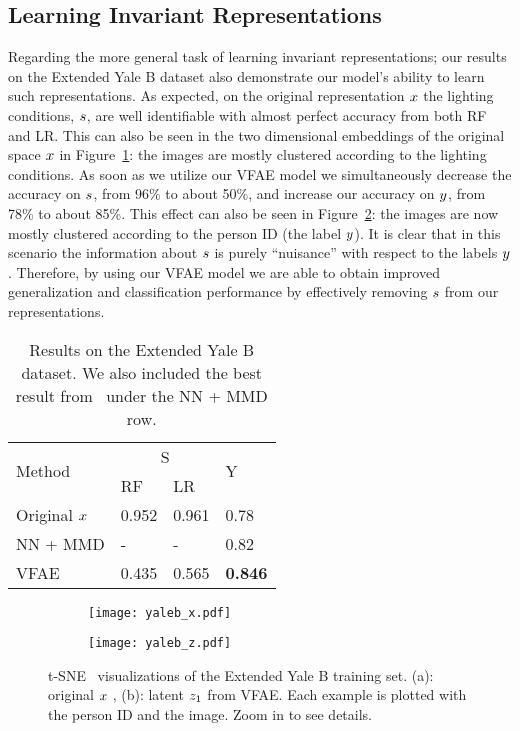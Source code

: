 \subsection{Learning Invariant Representations}
Regarding the more general task of learning invariant representations; our results on the Extended Yale B dataset also demonstrate our model's ability to learn such representations. As expected, on the original representation $\*x$ the lighting conditions, $\*s$, are well identifiable with almost perfect accuracy from both RF and LR. This can also be seen in the two dimensional embeddings of the original space $\*x$ in Figure~\ref{fig:yaleb_x}: the images are mostly clustered according to the lighting conditions. As soon as we utilize our VFAE model we simultaneously decrease the accuracy on $\*s$, from 96\% to about 50\%, and increase our accuracy on $\*y$, from 78\% to about 85\%. This effect can also be seen in Figure~\ref{fig:yaleb_z}: the images are now mostly clustered according to the person ID (the label $\*y$). It is clear that in this scenario the information about  $\*s$ is purely ``nuisance'' with respect to the labels $\*y$. Therefore, by using our VFAE model we are able to obtain improved generalization and classification performance by effectively removing $\*s$ from our representations.
   
\begin{table}[ht]
	\caption {Results on the Extended Yale B dataset. We also included the best result from~\cite{li2014learning} under the NN + MMD row.}
	\centering
	\label{tab:yaleb_results}
	\begin{center}
		\begin{tabular}{l|l|l|l}
			\hline
			\multirow{2}{*}{Method}  & \multicolumn{2}{c|}{S}  &  \multirow{2}{*}{Y} \\\cline{2-3}
			& RF & LR \\\hline
			Original $\*x$ & 0.952 & 0.961 & 0.78\\ 
			NN + MMD & - & - & 0.82\\
			VFAE & 0.435 & 0.565 & \textbf{0.846}\\
			\hline
		\end{tabular}
		\end{center}
\end{table}

\begin{figure}[ht]
    \centering
    \begin{subfigure}{.49\textwidth}
    \centering
        \texttt{[image: yaleb\_x.pdf]}
        \caption{}
        \label{fig:yaleb_x}
  \end{subfigure} \begin{subfigure}{.49\textwidth}
      \centering
        \texttt{[image: yaleb\_z.pdf]}
        \caption{}
        \label{fig:yaleb_z}
     \end{subfigure} \caption{t-SNE~\citep{2013arXiv1301.3342V} visualizations of the Extended Yale B training set. (a): original $\*x$ , (b):  latent $\*z_1$  from VFAE. Each example is plotted with the person ID and the image. Zoom in to see details.}
    \label{fig:yaleb_via}
\end{figure}

